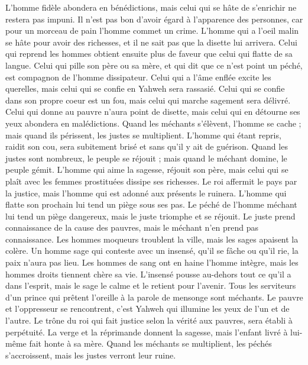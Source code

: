 \begin{multicols}{2}
L'homme fidèle abondera en bénédictions, mais celui qui se hâte de s'enrichir ne restera pas impuni.
Il n'est pas bon d'avoir égard à l'apparence des personnes, car pour un morceau de pain l'homme commet un crime.
L'homme qui a l'oeil malin se hâte pour avoir des richesses, et il ne sait pas que la disette lui arrivera.
Celui qui reprend les hommes obtient ensuite plus de faveur que celui qui flatte de sa langue.
Celui qui pille son père ou sa mère, et qui dit que ce n'est point un péché, est compagnon de l'homme dissipateur.
Celui qui a l’âme enflée excite les querelles, mais celui qui se confie en Yahweh sera rassasié.
Celui qui se confie dans son propre coeur est un fou, mais celui qui marche sagement sera délivré.
Celui qui donne au pauvre n'aura point de disette, mais celui qui en détourne ses yeux abondera en malédictions.
Quand les méchants s'élèvent, l'homme se cache ; mais quand ils périssent, les justes se multiplient.
\VerseOne{}L'homme qui étant repris, raidit son cou, sera subitement brisé et sans qu'il y ait de guérison.
Quand les justes sont nombreux, le peuple se réjouit ; mais quand le méchant domine, le peuple gémit.
L'homme qui aime la sagesse, réjouit son père, mais celui qui se plaît avec les femmes prostituées dissipe ses richesses.
Le roi affermit le pays par la justice, mais l'homme qui est adonné aux présents le ruinera.
L'homme qui flatte son prochain lui tend un piège sous ses pas.
Le péché de l'homme méchant lui tend un piège dangereux, mais le juste triomphe et se réjouit.
Le juste prend connaissance de la cause des pauvres, mais le méchant n'en prend pas connaissance.
Les hommes moqueurs troublent la ville, mais les sages apaisent la colère.
Un homme sage qui conteste avec un insensé, qu'il se fâche ou qu'il rie, la paix n'aura pas lieu.
Les hommes de sang ont en haine l'homme intègre, mais les hommes droits tiennent chère sa vie.
L’insensé pousse au-dehors tout ce qu’il a dans l’esprit, mais le sage le calme et le retient pour l’avenir.
Tous les serviteurs d'un prince qui prêtent l'oreille à la parole de mensonge sont méchants.
Le pauvre et l'oppresseur se rencontrent, c’est Yahweh qui illumine les yeux de l’un et de l’autre.
Le trône du roi qui fait justice selon la vérité aux pauvres, sera établi à perpétuité.
La verge et la réprimande donnent la sagesse, mais l'enfant livré à lui-même fait honte à sa mère.
Quand les méchants se multiplient, les péchés s’accroissent, mais les justes verront leur ruine.

\end{multicols}
